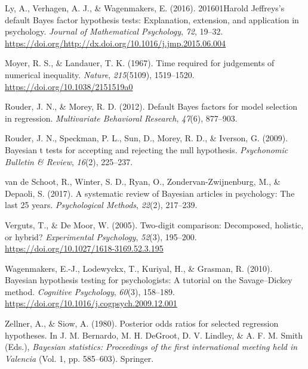 \documentclass[english,,doc,floatsintext]{apa6}
\begin{document}
\leavevmode\hypertarget{ref-ly2016harold}{}%
Ly, A., Verhagen, A. J., \& Wagenmakers, E. (2016). 201601Harold Jeffreys's default Bayes factor hypothesis tests: Explanation, extension, and application in psychology. \emph{Journal of Mathematical Psychology}, \emph{72}, 19--32. \url{https://doi.org/http://dx.doi.org/10.1016/j.jmp.2015.06.004}

\leavevmode\hypertarget{ref-moyer1967}{}%
Moyer, R. S., \& Landauer, T. K. (1967). Time required for judgements of numerical inequality. \emph{Nature}, \emph{215}(5109), 1519--1520. \url{https://doi.org/10.1038/2151519a0}

\leavevmode\hypertarget{ref-rouder2012defaultRegression}{}%
Rouder, J. N., \& Morey, R. D. (2012). Default Bayes factors for model selection in regression. \emph{Multivariate Behavioral Research}, \emph{47}(6), 877--903.

\leavevmode\hypertarget{ref-rouder2009bayesian}{}%
Rouder, J. N., Speckman, P. L., Sun, D., Morey, R. D., \& Iverson, G. (2009). Bayesian t tests for accepting and rejecting the null hypothesis. \emph{Psychonomic Bulletin \& Review}, \emph{16}(2), 225--237.

\leavevmode\hypertarget{ref-vandeschoot2017systematic}{}%
van de Schoot, R., Winter, S. D., Ryan, O., Zondervan-Zwijnenburg, M., \& Depaoli, S. (2017). A systematic review of Bayesian articles in psychology: The last 25 years. \emph{Psychological Methods}, \emph{22}(2), 217--239.

\leavevmode\hypertarget{ref-vergutsDeMoor2005}{}%
Verguts, T., \& De Moor, W. (2005). Two-digit comparison: Decomposed, holistic, or hybrid? \emph{Experimental Psychology}, \emph{52}(3), 195--200. \url{https://doi.org/10.1027/1618-3169.52.3.195}

\leavevmode\hypertarget{ref-wagenmakers2010}{}%
Wagenmakers, E.-J., Lodewyckx, T., Kuriyal, H., \& Grasman, R. (2010). Bayesian hypothesis testing for psychologists: A tutorial on the Savage--Dickey method. \emph{Cognitive Psychology}, \emph{60}(3), 158--189. \url{https://doi.org/10.1016/j.cogpsych.2009.12.001}

\leavevmode\hypertarget{ref-zellner1980posterior}{}%
Zellner, A., \& Siow, A. (1980). Posterior odds ratios for selected regression hypotheses. In J. M. Bernardo, M. H. DeGroot, D. V. Lindley, \& A. F. M. Smith (Eds.), \emph{Bayesian statistics: Proceedings of the first international meeting held in Valencia} (Vol. 1, pp. 585--603). Springer.
\end{document}
